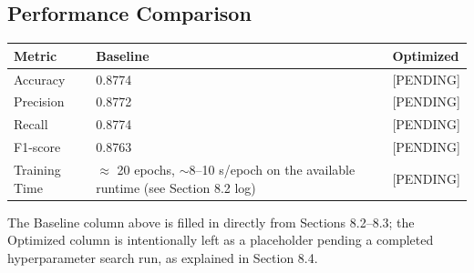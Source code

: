 \documentclass[11pt]{article}
\begin{document}
\subsection*{Performance Comparison}
\begin{center}
\begin{tabular}{|l|l|l|}
\hline
\textbf{Metric} & \textbf{Baseline} & \textbf{Optimized} \\
\hline
Accuracy & 0.8774 & [PENDING] \\
\hline
Precision & 0.8772 & [PENDING] \\
\hline
Recall & 0.8774 & [PENDING] \\
\hline
F1-score & 0.8763 & [PENDING] \\
\hline
Training Time & $\approx$ 20 epochs, $\sim$8--10 s/epoch on the available runtime (see Section 8.2 log) & [PENDING] \\
\hline
\end{tabular}
\end{center}

The Baseline column above is filled in directly from Sections 8.2--8.3; the Optimized column is intentionally left as a placeholder pending a completed hyperparameter search run, as explained in Section 8.4.

\end{document}
